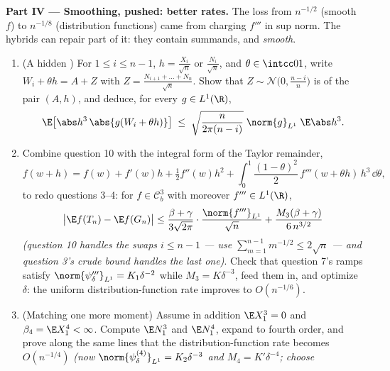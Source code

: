 \begin{problem}
\medskip
\noindent\textbf{Part IV --- Smoothing, pushed: better
rates.} The loss from $n^{-1/2}$ (smooth $f$) to
$n^{-1/8}$ (distribution functions) came from charging
$f'''$ in sup norm. The hybrids can repair part of it: they
contain  summands, and  \emph{smooth}.
\begin{enumerate}[resume]
  \item (A hidden ) For $1 \leq i \leq n - 1$, $h =
        \frac{X_i}{\sqrt n}$ or $\frac{N_i}{\sqrt n}$, and
        $\theta \in \intcc01$, write $W_i + \theta h = A +
        Z$ with $Z = \frac{N_{i+1} + \dots + N_n}{\sqrt
        n}$. Show that $Z \sim \mathcal N\bigl(0,
        \frac{n-i}n\bigr)$ is  of the pair $(A,
        h)$, and deduce, for every  $g \in
        L^1(\R)$,
        \[
        \E\bigl[\abs h^3\,\abs{g(W_i + \theta h)}\bigr]
        \;\leq\; \sqrt{\frac{n}{2\pi(n - i)}}\;
        \norm{g}_{L^1}\;\E\abs h^3 .
        \]
  \item Combine question 10 with the integral form of the
        Taylor remainder,
        \[
        f(w + h) = f(w) + f'(w)h + \tfrac12f''(w)h^2 +
        \int_0^1\frac{(1 - \theta)^2}2\,f'''(w + \theta
        h)\,h^3\,\dd\theta,
        \]
        to redo questions 3--4: for $f \in \mathcal C^3_b$
        with moreover $f''' \in L^1(\R)$,
        \[
        \bigl|\E f(T_n) - \E f(G_n)\bigr| \leq
        \frac{\beta + \gamma}{3\sqrt{2\pi}}\cdot
        \frac{\norm{f'''}_{L^1}}{\sqrt n} +
        \frac{M_3(\beta + \gamma)}{6\,n^{3/2}}
        \]
        \emph{(question 10 handles the swaps $i \leq n - 1$
        --- use $\sum_{m=1}^{n-1}m^{-1/2} \leq 2\sqrt n$
        --- and question 3's crude bound handles the last
        one)}. Check that question 7's ramps satisfy
        $\norm{\psi_\delta'''}_{L^1} = K_1\delta^{-2}$
        while $M_3 = K\delta^{-3}$, feed them in, and
        optimize $\delta$: the uniform
        distribution-function rate improves to
        $O(n^{-1/6})$.
  \item (Matching one more moment) Assume in addition $\E
        X_1^3 = 0$ and $\beta_4 = \E X_1^4 < \infty$.
        Compute $\E N_1^3$ and $\E N_1^4$, expand to fourth
        order, and prove along the same lines that the
        distribution-function rate becomes $O(n^{-1/4})$
        \emph{(now $\norm{\psi_\delta^{(4)}}_{L^1} =
        K_2\delta^{-3}$ and $M_4 = K'\delta^{-4}$; choose
}
\end{enumerate}
\end{problem}
